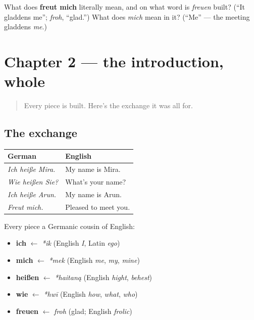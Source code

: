 \begin{tcolorbox}[breakable,colback=teal!4,colframe=teal!35!black,title={Before you move on}]
What does \textbf{freut mich} literally mean, and on what word is \emph{freuen} built? (\textquotedblleft{}It gladdens me\textquotedblright{}; \emph{froh}, \textquotedblleft{}glad.\textquotedblright{}) What does \emph{mich} mean in it? (\textquotedblleft{}Me\textquotedblright{} — the meeting gladdens \emph{me}.)
\end{tcolorbox}
\section[Practice]{Chapter 2 — the introduction, whole}

\label{lesson:GE-C02-practice}



\begin{quote}
Every piece is built. Here's the exchange it was all for.
\end{quote}

\subsection*{The exchange}
\noindent
\begin{tabularx}{\linewidth}{@{}>{\raggedright\arraybackslash}X>{\raggedright\arraybackslash}X@{}}
\toprule
\textbf{German} & \textbf{English} \\
\midrule
\emph{Ich heiße Mira.} & My name is Mira. \\
\emph{Wie heißen Sie?} & What's your name? \\
\emph{Ich heiße Arun.} & My name is Arun. \\
\emph{Freut mich.} & Pleased to meet you. \\
\bottomrule
\end{tabularx}

Every piece a Germanic cousin of English:

\begin{itemize}
\raggedright
  \item \textbf{ich} $\leftarrow$ \emph{*ik} (English \emph{I}, Latin \emph{ego})
  \item \textbf{mich} $\leftarrow$ \emph{*mek} (English \emph{me}, \emph{my}, \emph{mine})
  \item \textbf{heißen} $\leftarrow$ \emph{*haitaną} (English \emph{hight}, \emph{behest})
  \item \textbf{wie} $\leftarrow$ \emph{*hwī} (English \emph{how}, \emph{what}, \emph{who})
  \item \textbf{freuen} $\leftarrow$ \emph{froh} (glad; English \emph{frolic})
\end{itemize}

